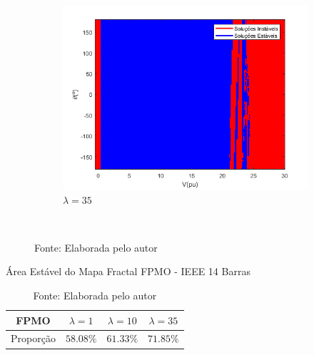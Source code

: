 \begin{figure}[H]
\begin{subfigure}[b]{0.45\textwidth}
        \centering
        \includegraphics[width=\textwidth]{textuais/capitulo4/figuras/fp_om_20lambda.png}
        \caption{$\lambda=35$}
    \end{subfigure}
        \\
   \caption*{Fonte: Elaborada pelo autor}
   \label{fig:FPMO-14}
\end{figure}

\begin{table}[H]
    \centering
    \caption{Área Estável do Mapa Fractal FPMO - IEEE 14 Barras}
    \begin{tabular}{c c c c}
        \toprule
        FPMO & $\lambda = 1$ & $\lambda = 10$ & $\lambda = 35$ \\
        \midrule
        Proporção & $58.08\%$ & $61.33\%$ & $71.85\%$ \\
        \bottomrule
    \end{tabular}
    \caption*{Fonte: Elaborada pelo autor}
    \label{tabela_fractal_FPMO_14}
\end{table}

